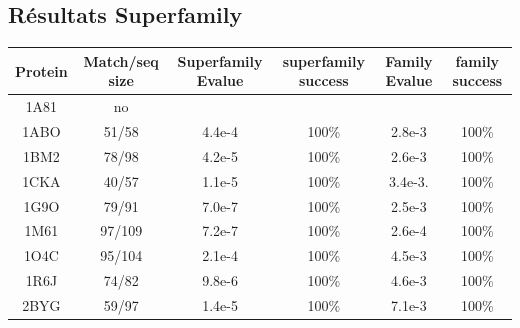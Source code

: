 \documentclass[a4paper,12pt]{article}
\begin{document}
    
    \clearpage





   \subsection{ Résultats Superfamily}


    \begin{table}[h]
           \raggedleft

      \begin{tabular}{|c|c|c|c|c|c|}

        \hline
        Protein & Match/seq size & Superfamily Evalue & superfamily success & Family Evalue & family success\\
        \hline
        1A81 & no & & & & \\
        1ABO & 51/58 & 4.4e-4 & 100\% & 2.8e-3 & 100\% \\
        1BM2 & 78/98 & 4.2e-5 & 100\% & 2.6e-3 & 100\% \\
        1CKA & 40/57 & 1.1e-5 & 100\% & 3.4e-3. & 100\% \\
        1G9O & 79/91 & 7.0e-7 & 100\% & 2.5e-3 & 100\%  \\
        1M61 & 97/109 & 7.2e-7 & 100\% & 2.6e-4 &  100\% \\
        1O4C & 95/104 & 2.1e-4 & 100\% & 4.5e-3 &  100\% \\
        1R6J & 74/82 & 9.8e-6 & 100\% & 4.6e-3 &  100\% \\
        2BYG & 59/97 & 1.4e-5 & 100\% & 7.1e-3 &  100\% \\

        \hline


 \end{tabular}      


 \label{tab_echec2BYG__1}       
\end{table}



    \clearpage
\end{document}
